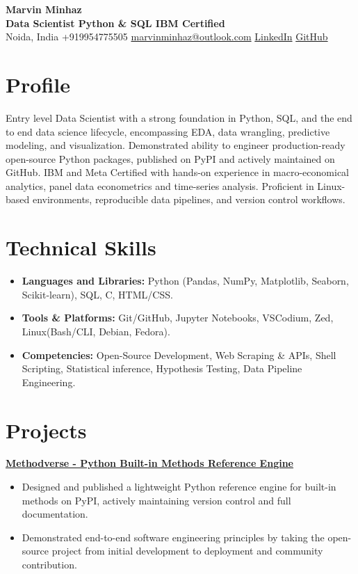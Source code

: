 \documentclass[10pt, a4paper]{article}
\begin{document}
	\pagestyle{empty}
	
	\begin{center}
		{\Huge \textbf{Marvin Minhaz}}\\[0.5em]
		\textbf{Data Scientist \textbar \space Python \& SQL \textbar \space IBM Certified}\\[0.2em]
		Noida, India \textbar\space +919954775505 \textbar\space \href{mailto:marvinminhaz@outlook.com}{marvinminhaz@outlook.com} \textbar\space \href{https://linkedin.com/in/marvinminhaz}{LinkedIn} \textbar\space \href{https://github.com/marvinminhaz}{GitHub}
	\end{center}
	
	\section{Profile}
	\noindent Entry level Data Scientist with a strong foundation in Python, SQL, and the end to end data science lifecycle, encompassing EDA, data wrangling, predictive modeling, and visualization. Demonstrated ability to engineer production-ready open-source Python packages, published on PyPI and actively maintained on GitHub. IBM and Meta Certified with hands-on experience in macro-economical analytics, panel data econometrics and time-series analysis. Proficient in Linux-based environments, reproducible data pipelines, and version control workflows.
	
	\section{Technical Skills}
	\begin{itemize}[leftmargin=0in, label={}]
		\item \textbf{Languages and Libraries:} Python (Pandas, NumPy, Matplotlib, Seaborn, Scikit-learn), SQL, C, HTML/CSS.
		\item \textbf{Tools \& Platforms:} Git/GitHub, Jupyter Notebooks, VSCodium, Zed, Linux(Bash/CLI, Debian, Fedora).
		\item \textbf{Competencies:} Open-Source Development, Web Scraping \& APIs, Shell Scripting, Statistical inference, Hypothesis Testing, Data Pipeline Engineering.
	\end{itemize}
	
	\section{Projects}
	\noindent\href{https://github.com/marvinminhaz/methodverse}{\textbf{Methodverse - Python Built-in Methods Reference Engine}}\hfill
	\begin{itemize}[leftmargin=0.15in, topsep=2pt, partopsep=0pt, parsep=0pt, itemsep=2pt]
		\item Designed and published a lightweight Python reference engine for built-in methods on PyPI, actively maintaining version control and full documentation.
		\item Demonstrated end-to-end software engineering principles by taking the open-source project from initial development to deployment and community contribution.
	\end{itemize}
	\vspace{0.6em}
	
\end{document}
